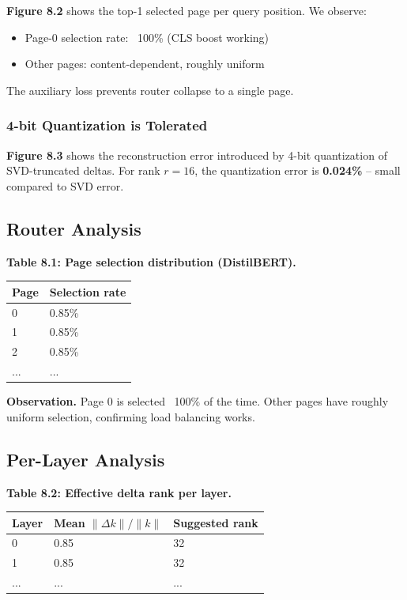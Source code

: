 \textbf{Figure 8.2} shows the top-1 selected page per query position. We observe:

\begin{itemize}
\item Page-0 selection rate: ~100\% (CLS boost working)
\item Other pages: content-dependent, roughly uniform

\end{itemize}
The auxiliary loss prevents router collapse to a single page.

\subsubsection{4-bit Quantization is Tolerated}

\textbf{Figure 8.3} shows the reconstruction error introduced by 4-bit 
quantization of SVD-truncated deltas. For rank $r = 16$, the quantization 
error is \textbf{0.024\%} -- small compared to SVD error.

\subsection{Router Analysis}

\textbf{Table 8.1: Page selection distribution (DistilBERT).}

\begin{table}[H]
\centering
\small
\begin{tabular}{ll}
\toprule
\textbf{Page} & \textbf{Selection rate} \\
\midrule
0 & 0.85\% \\
1 & 0.85\% \\
2 & 0.85\% \\
... & ... \\
\bottomrule
\end{tabular}
\end{table}

\textbf{Observation.} Page 0 is selected ~100\% of the time. Other pages have 
roughly uniform selection, confirming load balancing works.

\subsection{Per-Layer Analysis}

\textbf{Table 8.2: Effective delta rank per layer.}

\begin{table}[H]
\centering
\small
\begin{tabular}{lll}
\toprule
\textbf{Layer} & \textbf{Mean $\|\Delta k\| / \|k\|$} & \textbf{Suggested rank} \\
\midrule
0 & 0.85 & 32 \\
1 & 0.85 & 32 \\
... & ... & ... \\
\bottomrule
\end{tabular}
\end{table}

